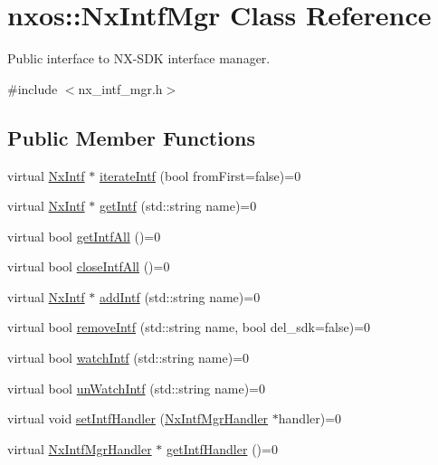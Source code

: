 \hypertarget{classnxos_1_1_nx_intf_mgr}{}\section{nxos\+:\+:Nx\+Intf\+Mgr Class Reference}
\label{classnxos_1_1_nx_intf_mgr}


Public interface to N\+X-\/\+S\+DK interface manager.  




{\ttfamily \#include $<$nx\+\_\+intf\+\_\+mgr.\+h$>$}

\subsection*{Public Member Functions}
\begin{DoxyCompactItemize}
\item 
virtual \mbox{\hyperlink{classnxos_1_1_nx_intf}{Nx\+Intf}} $\ast$ \mbox{\hyperlink{classnxos_1_1_nx_intf_mgr_acbe3d94cba5b7982d80cc498d7fcbdf7}{iterate\+Intf}} (bool from\+First=false)=0
\item 
virtual \mbox{\hyperlink{classnxos_1_1_nx_intf}{Nx\+Intf}} $\ast$ \mbox{\hyperlink{classnxos_1_1_nx_intf_mgr_a1271144b1921be0dcb27a6aa7310bbc5}{get\+Intf}} (std\+::string name)=0
\item 
virtual bool \mbox{\hyperlink{classnxos_1_1_nx_intf_mgr_af70ee700e633a9f5ae35608d7637ee04}{get\+Intf\+All}} ()=0
\item 
virtual bool \mbox{\hyperlink{classnxos_1_1_nx_intf_mgr_a45e7cb2a8e3919667c14264dd618168a}{close\+Intf\+All}} ()=0
\item 
virtual \mbox{\hyperlink{classnxos_1_1_nx_intf}{Nx\+Intf}} $\ast$ \mbox{\hyperlink{classnxos_1_1_nx_intf_mgr_a818e4d019413e8111cbb9610e465f714}{add\+Intf}} (std\+::string name)=0
\item 
virtual bool \mbox{\hyperlink{classnxos_1_1_nx_intf_mgr_a89ab4d3bcc05b6c2d938ebd969454306}{remove\+Intf}} (std\+::string name, bool del\+\_\+sdk=false)=0
\item 
virtual bool \mbox{\hyperlink{classnxos_1_1_nx_intf_mgr_aa07fd4d582d52a9aac7a2efd88675bfc}{watch\+Intf}} (std\+::string name)=0
\item 
virtual bool \mbox{\hyperlink{classnxos_1_1_nx_intf_mgr_a325eed4d08efc01fca1993148911a21a}{un\+Watch\+Intf}} (std\+::string name)=0
\item 
virtual void \mbox{\hyperlink{classnxos_1_1_nx_intf_mgr_a9a8927131c8edd906ff035a2bbbe0eb0}{set\+Intf\+Handler}} (\mbox{\hyperlink{classnxos_1_1_nx_intf_mgr_handler}{Nx\+Intf\+Mgr\+Handler}} $\ast$handler)=0
\item 
virtual \mbox{\hyperlink{classnxos_1_1_nx_intf_mgr_handler}{Nx\+Intf\+Mgr\+Handler}} $\ast$ \mbox{\hyperlink{classnxos_1_1_nx_intf_mgr_af3fff8d1738bc43b2441a8b868984665}{get\+Intf\+Handler}} ()=0
\end{DoxyCompactItemize}


